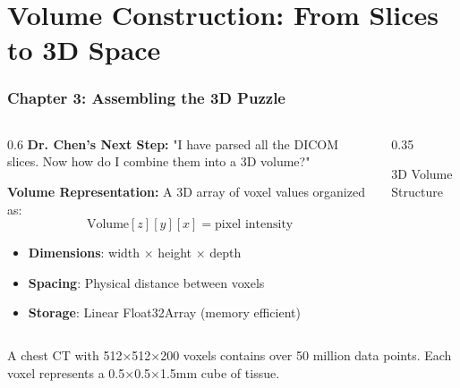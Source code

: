 \section{Volume Construction: From Slices to 3D Space}

\begin{frame}
\frametitle{Chapter 3: Assembling the 3D Puzzle}

\begin{columns}[T]
\begin{column}{0.6\textwidth}
  \textbf{Dr. Chen's Next Step:} "I have parsed all the DICOM slices. Now how do I combine them into a 3D volume?"
  
  \vspace{0.5cm}
  \textbf{Volume Representation:} A 3D array of voxel values organized as:
  $$\text{Volume}[z][y][x] = \text{pixel intensity}$$
  
  \begin{itemize}
    \item \textbf{Dimensions}: width $\times$ height $\times$ depth
    \item \textbf{Spacing}: Physical distance between voxels
    \item \textbf{Storage}: Linear Float32Array (memory efficient)
  \end{itemize}
\end{column}
\begin{column}{0.35\textwidth}
  \begin{center}
    \vspace{0.3cm}
    {\small\color{medicalgray}3D Volume Structure}
  \end{center}
\end{column}
\end{columns}

A chest CT with 512×512×200 voxels contains over 50 million data points. Each voxel represents a 0.5×0.5×1.5mm cube of tissue.
\end{frame}

